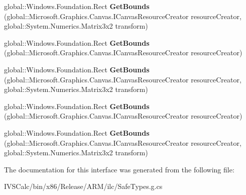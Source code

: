 \begin{DoxyCompactItemize}
global\+::\+Windows.\+Foundation.\+Rect {\bfseries Get\+Bounds} (global\+::\+Microsoft.\+Graphics.\+Canvas.\+I\+Canvas\+Resource\+Creator resource\+Creator, global\+::\+System.\+Numerics.\+Matrix3x2 transform)
\item 
\mbox{\label{interface_microsoft_1_1_graphics_1_1_canvas_1_1_i_canvas_image_a5880a8f26f51e821ddad972938b1fbcc}} 
global\+::\+Windows.\+Foundation.\+Rect {\bfseries Get\+Bounds} (global\+::\+Microsoft.\+Graphics.\+Canvas.\+I\+Canvas\+Resource\+Creator resource\+Creator)
\item 
\mbox{\label{interface_microsoft_1_1_graphics_1_1_canvas_1_1_i_canvas_image_a3bdaec853bbdb697eac7e7c882f007d1}} 
global\+::\+Windows.\+Foundation.\+Rect {\bfseries Get\+Bounds} (global\+::\+Microsoft.\+Graphics.\+Canvas.\+I\+Canvas\+Resource\+Creator resource\+Creator, global\+::\+System.\+Numerics.\+Matrix3x2 transform)
\item 
\mbox{\label{interface_microsoft_1_1_graphics_1_1_canvas_1_1_i_canvas_image_a5880a8f26f51e821ddad972938b1fbcc}} 
global\+::\+Windows.\+Foundation.\+Rect {\bfseries Get\+Bounds} (global\+::\+Microsoft.\+Graphics.\+Canvas.\+I\+Canvas\+Resource\+Creator resource\+Creator)
\item 
\mbox{\label{interface_microsoft_1_1_graphics_1_1_canvas_1_1_i_canvas_image_a3bdaec853bbdb697eac7e7c882f007d1}} 
global\+::\+Windows.\+Foundation.\+Rect {\bfseries Get\+Bounds} (global\+::\+Microsoft.\+Graphics.\+Canvas.\+I\+Canvas\+Resource\+Creator resource\+Creator, global\+::\+System.\+Numerics.\+Matrix3x2 transform)
\end{DoxyCompactItemize}


The documentation for this interface was generated from the following file\+:\begin{DoxyCompactItemize}
\item 
I\+V\+S\+Calc/bin/x86/\+Release/\+A\+R\+M/ilc/Safe\+Types.\+g.\+cs\end{DoxyCompactItemize}
